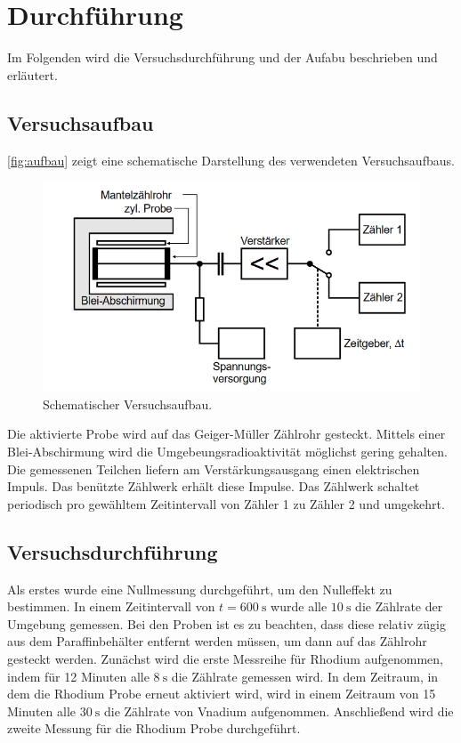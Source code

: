 \section{Durchführung}
\label{sec:durchführung}
Im Folgenden wird die Versuchsdurchführung und der Aufabu beschrieben und erläutert.

\subsection{Versuchsaufbau}
\label{sec:Versuchsaufbau}

\autoref{fig:aufbau} zeigt eine schematische Darstellung des verwendeten Versuchsaufbaus.
\begin{figure}[H]
    \centering
    \includegraphics[width=0.8\linewidth]{content/grafik/aufbau.png}
    \caption{Schematischer Versuchsaufbau.\cite{neutron}}
    \label{fig:aufbau}
\end{figure}

Die aktivierte Probe wird auf das Geiger-Müller Zählrohr gesteckt. Mittels einer Blei-Abschirmung wird die 
Umgebeungsradioaktivität möglichst gering gehalten. Die gemessenen Teilchen liefern am Verstärkungsausgang einen elektrischen 
Impuls. Das benützte Zählwerk erhält diese Impulse. Das Zählwerk schaltet periodisch pro gewähltem Zeitintervall
von Zähler 1 zu Zähler 2  und umgekehrt.

\subsection{Versuchsdurchführung}
\label{sec:Versuchsdurchführung}

Als erstes wurde eine Nullmessung durchgeführt, um den Nulleffekt zu bestimmen. In einem Zeitintervall von $t = \SI{600}{\second}$
wurde alle $\SI{10}{\second}$ die Zählrate der Umgebung gemessen.
Bei den Proben ist es zu beachten, dass diese relativ zügig aus dem Paraffinbehälter entfernt werden müssen, um dann auf 
das Zählrohr gesteckt werden. Zunächst wird die erste Messreihe für Rhodium aufgenommen, indem für 12 Minuten alle $\SI{8}{\second}$
die Zählrate gemessen wird. In dem Zeitraum, in dem die Rhodium Probe erneut aktiviert wird, wird in einem Zeitraum von 15 Minuten
alle $\SI{30}{\second}$ die Zählrate von Vnadium aufgenommen. Anschließend wird die zweite Messung für die Rhodium Probe durchgeführt.